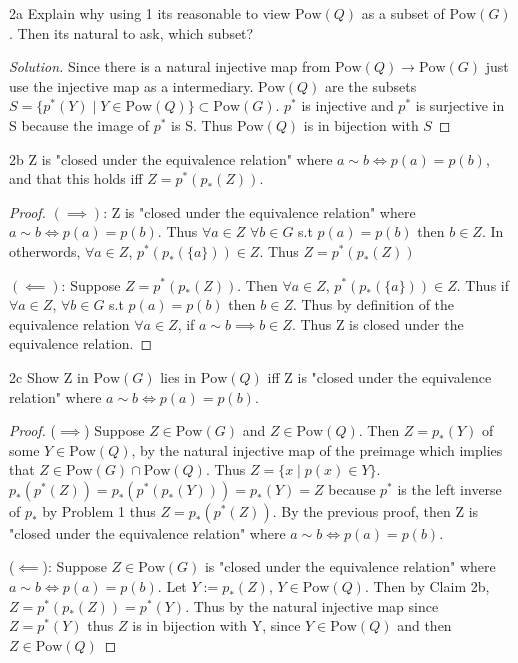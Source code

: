 \documentclass{article}
\newcommand{\Pow}[0]{\text{Pow}}
\newenvironment{solution}
{\renewcommand\qedsymbol{$\blacksquare$}\begin{proof}[Solution]}
{\end{proof}}
\begin{document}
\bigskip

\begin{PROB}{2a}\label{Problem 2a.}
    Explain why using 1 its reasonable to view $\Pow(Q)$ as a subset of $\Pow(G)$. Then its natural to ask, which subset?  
\end{PROB}
\begin{solution}
    Since there is a natural injective map from $\Pow(Q) \to \Pow(G)$ just use the injective map as a intermediary. $\Pow(Q)$ are the subsets $S = \{p^*(Y) \mid Y \in \Pow(Q)\} \subset \Pow(G)$. $p^*$ is injective and $p^*$ is surjective in S because the image of $p^*$ is S. Thus $\Pow(Q)$ is in bijection with $S$
\end{solution}

\begin{claim}{2b}
    Z is "closed under the equivalence relation" where $a \sim b \iff p(a) = p(b)$, and that this holds iff $Z = p^*(p_*(Z))$.
\end{claim}
\begin{proof}
    $(\implies)$: Z is "closed under the equivalence relation" where $a \sim b \iff p(a) = p(b)$. Thus $\forall a \in Z$ $\forall b \in G$ s.t $p(a) = p(b)$ then $b \in Z$. In otherwords, $\forall a \in Z$, $p^*(p_*(\{a\})) \in Z$. Thus $Z = p^*(p_*(Z))$

    $(\impliedby)$: Suppose $Z = p^*(p_*(Z))$. Then $\forall a \in Z$, $p^*(p_*(\{a\})) \in Z$. Thus if $\forall a \in Z$, $\forall b \in G$ s.t $p(a) = p(b)$ then $b \in Z$. Thus by definition of the equivalence relation $\forall a \in Z$, if $a \sim b \implies b \in Z$. Thus Z is closed under the equivalence relation.  
\end{proof}

\begin{claim}{2c}
    Show Z in $\Pow(G)$ lies in $\Pow(Q)$ iff Z is "closed under the equivalence relation" where $a \sim b \iff p(a) = p(b)$.
\end{claim}
\begin{proof}
    ($\implies$) Suppose $Z \in \Pow(G)$ and $Z \in \Pow(Q)$. Then $Z = p_*(Y)$ of some $Y \in \Pow(Q)$, by the natural injective map of the preimage which implies that $Z \in \Pow(G) \cap \Pow(Q)$. Thus $Z = \{x \mid p(x) \in Y\}$. $p_*(p^*(Z)) = p_*(p^*(p_*(Y))) = p_*(Y) = Z$ because $p^*$ is the left inverse of $p_*$ by Problem 1 thus $Z = p_*(p^*(Z))$. By the previous proof, then Z is "closed under the equivalence relation" where $a \sim b \iff p(a) = p(b)$.

    ($\impliedby$): Suppose $Z \in \Pow(G)$ is "closed under the equivalence relation" where $a \sim b \iff p(a) = p(b)$. Let $Y := p_*(Z)$, $Y \in \Pow(Q)$. Then by Claim 2b, $Z = p^*(p_*(Z)) = p^*(Y)$. Thus by the natural injective map since $Z = p^*(Y)$ thus $Z$ is in bijection with Y, since $Y \in \Pow(Q)$ and then $Z \in \Pow(Q)$ 
\end{proof}
\end{document}
